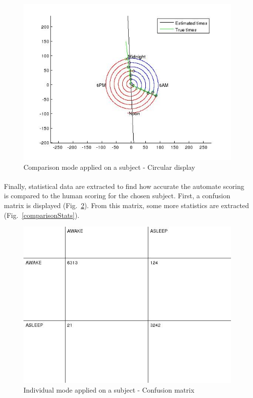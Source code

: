 \documentclass[a4paper,12pt]{article}
\begin{document}
\begin{figure}[H]
\centering
\includegraphics[scale=0.75]{Images/comparisonResultsCircle.jpg}
\caption{Comparison mode applied on a subject - Circular display}
\label{comparisonCircle}
\end{figure}

\paragraph{}
Finally, statistical data are extracted to find how accurate the automate scoring is compared to the human scoring for the chosen subject. First, a confusion matrix is displayed (Fig.~\ref{comparisonMatrix}). From this matrix, some more statistics are extracted (Fig.~\ref{comparisonStats}).

\begin{figure}[H]
\centering
\includegraphics[scale=0.75]{Images/comparisonResultsMatrix.jpg}
\caption{Individual mode applied on a subject - Confusion matrix}
\label{comparisonMatrix}
\end{figure}
\end{document}
